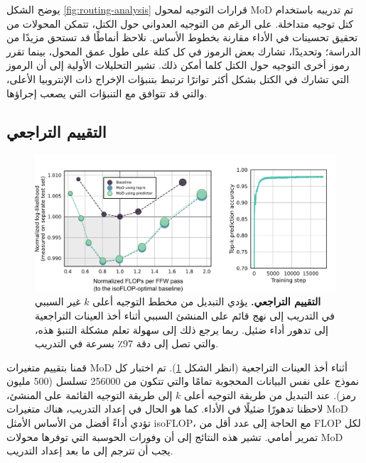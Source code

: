 \documentclass[11pt, a4paper, onecolumn, logo, copyright]{googledeepmind}
\begin{document}
يوضح الشكل \ref{fig:routing-analysis} قرارات التوجيه لمحول MoD تم تدريبه باستخدام كتل توجيه متداخلة. على الرغم من التوجيه العدواني حول الكتل، تتمكن المحولات من تحقيق تحسينات في الأداء مقارنة بخطوط الأساس. نلاحظ أنماطًا قد تستحق مزيدًا من الدراسة؛ وتحديدًا، تشارك بعض الرموز في كل كتلة على طول عمق المحول، بينما تقرر رموز أخرى التوجيه حول الكتل كلما أمكن ذلك. تشير التحليلات الأولية إلى أن الرموز التي تشارك في الكتل بشكل أكثر تواترًا ترتبط بتنبؤات الإخراج ذات الإنتروبيا الأعلى، والتي قد تتوافق مع التنبؤات التي يصعب إجراؤها.

\subsection{التقييم التراجعي}
\begin{figure}[h]
\centering
\includegraphics[width=\textwidth]{autoregressive.png}
\caption{\textbf{التقييم التراجعي.} يؤدي التبديل من مخطط التوجيه أعلى $k$ غير السببي في التدريب إلى نهج قائم على المنشئ السببي أثناء أخذ العينات التراجعية إلى تدهور أداء ضئيل. ربما يرجع ذلك إلى سهولة تعلم مشكلة التنبؤ هذه، والتي تصل إلى دقة 97٪ بسرعة في التدريب.}
\label{fig:autoregressive}
\end{figure}

قمنا بتقييم متغيرات MoD أثناء أخذ العينات التراجعية (انظر الشكل \ref{fig:autoregressive}). تم اختبار كل نموذج على نفس البيانات المحجوبة تمامًا والتي تتكون من 256000 تسلسل (500 مليون رمز). عند التبديل من طريقة التوجيه أعلى $k$ إلى طريقة التوجيه القائمة على المنشئ، لاحظنا تدهورًا ضئيلًا في الأداء. كما هو الحال في إعداد التدريب، هناك متغيرات MoD تؤدي أداءً أفضل من الأساس الأمثل isoFLOP، مع الحاجة إلى عدد أقل من FLOP لكل تمرير أمامي. تشير هذه النتائج إلى أن وفورات الحوسبة التي توفرها محولات MoD يجب أن تترجم إلى ما بعد إعداد التدريب.
\end{document}
